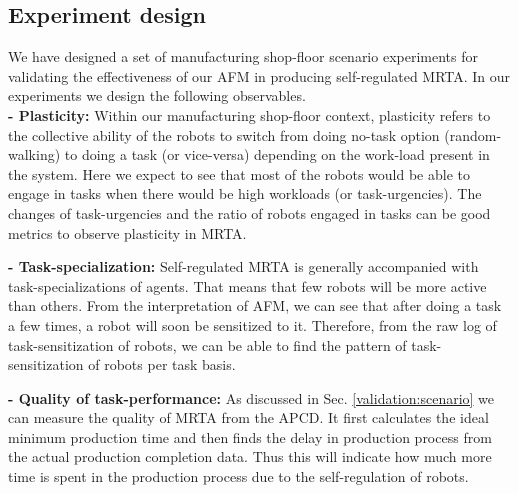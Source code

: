 \documentclass{intech}
\begin{document}
\subsection{Experiment design}
We have designed a set of  manufacturing shop-floor scenario experiments for validating the effectiveness of our AFM in producing self-regulated MRTA. In our experiments we design the following observables.\\
\textbf{- Plasticity:} Within our manufacturing shop-floor context, plasticity refers to the collective ability of the robots to switch from doing no-task option (random-walking) to doing a task (or vice-versa) depending on the work-load present in the system. Here we expect to see that most of the robots would be able to engage in tasks when there would be high workloads (or task-urgencies). The changes of task-urgencies and the ratio of robots engaged in tasks can be good metrics to observe plasticity in MRTA.

\textbf{- Task-specialization:} Self-regulated MRTA is generally accompanied with task-specializations of agents. That means that few robots will be more active than others. From the interpretation of AFM, we can see that after doing a task a few times, a robot will soon be sensitized to it. Therefore, from the raw log of task-sensitization of robots, we can be able to find the pattern of task-sensitization of robots per task basis.

\textbf{- Quality of task-performance:} As discussed in Sec. \ref{validation:scenario} we can measure the quality of MRTA from the APCD. It first calculates the ideal minimum production time and then finds the delay in production process from the actual production completion data. Thus this will indicate how much more time is  spent in the production process due to the self-regulation of robots.
\end{document}
